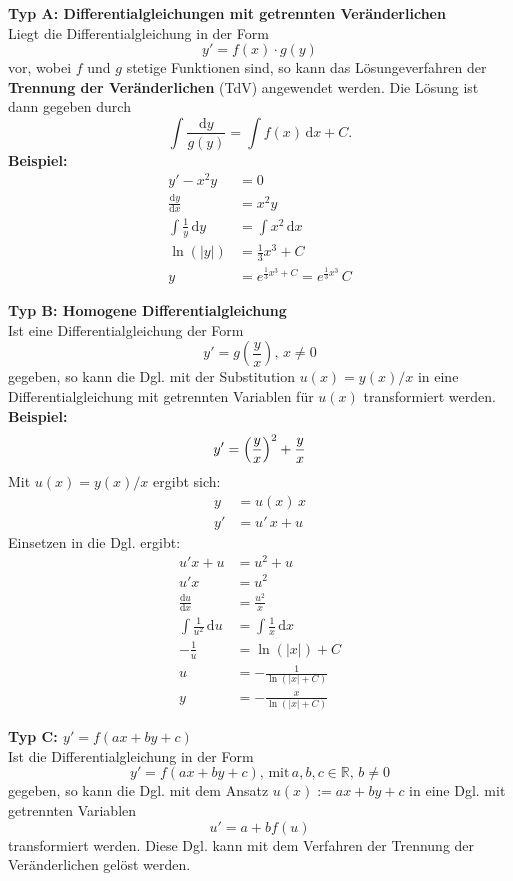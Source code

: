 \noindent
\textbf{Typ A: Differentialgleichungen mit getrennten Ver\"anderlichen}\\
Liegt die Differentialgleichung in der Form
$$
y' =f(x)\cdot g(y)
$$
vor, wobei $f$ und $g$ stetige Funktionen sind, so kann das L\"osungeverfahren der \textbf{Trennung der Ver\"anderlichen} (TdV) angewendet werden. Die L\"osung ist dann gegeben durch
$$
\int \dfrac{\mathrm{d}y}{g(y)} = \int f(x) \, \mathrm{d}x +C.
$$
\textbf{Beispiel:} 
\begin{align*}
y'-x^2y &= 0 \\
\frac{\mathrm{d}y}{\mathrm{d}x} &= x^2y \\
\int \frac{1}{y} \, \mathrm{d}y &= \int x^2 \, \mathrm{d}x \\
\ln(|y|) &= \frac{1}{3} x^3 +C \\
y        &= e^{\frac{1}{3}x^3+C} = e^{\frac{1}{3}x^3} \, C
\end{align*}

\noindent
\textbf{Typ B: Homogene Differentialgleichung}\\
Ist eine Differentialgleichung der Form
$$
y' =g \left( \dfrac{y}{x} \right), \, x \neq 0 
$$
gegeben, so kann die Dgl. mit der Substitution $u(x) = y(x)/x$ in eine Differentialgleichung mit getrennten Variablen f\"ur $u(x)$ transformiert werden.\\

\noindent
\textbf{Beispiel:} 
$$
y' = \left( \frac{y}{x} \right)^2 +\frac{y}{x} \\
$$
Mit $u(x) = y(x)/x$ ergibt sich:
\begin{align*}
y &= u(x) \, x \\
y'   &= u' \, x + u 
\end{align*}
Einsetzen in die Dgl. ergibt:
\begin{align*}
u' x + u &= u^2 +u \\
u' x &= u^2 \\
\frac{\mathrm{d}u}{\mathrm{d}x} &= \frac{u^2}{x} \\
\int \frac{1}{u^2}\, \mathrm{d}u &= \int \frac{1}{x} \, \mathrm{d}x \\
-\frac{1}{u} &= \ln(|x|)+C \\
u &= - \frac{1}{\ln(|x| +C)} \\
y &= - \frac{x}{\ln(|x| +C)}
\end{align*}



\noindent
\textbf{Typ C: $y' = f(ax+by+c)$}\\
Ist die Differentialgleichung in der Form 
$$
y' = f(ax+by+c), \, \text{mit} \, a,b,c \in \mathbb{R}, \, b \neq 0
$$
gegeben, so kann die Dgl. mit dem Ansatz $u(x):= ax+by+c$ in eine Dgl. mit getrennten Variablen
$$
u' = a +b f(u)
$$
transformiert werden. Diese Dgl. kann mit dem Verfahren der Trennung der Ver\"anderlichen gel\"ost werden.\\


